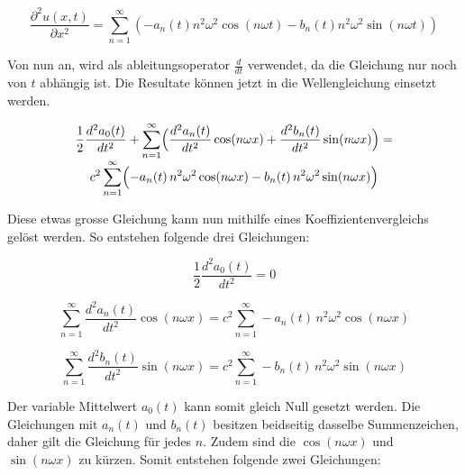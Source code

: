 \begin{equation}
	\frac{\partial^2 u(x,t)}{\partial x^2} = \sum_{n=1}^{\infty} \left( -a_n(t) n^2 \omega^2 \cos(n \omega t) - b_n(t) n^2 \omega^2 \sin(n \omega t) \right)
\end{equation}


Von nun an, wird als ableitungsoperator $\frac{d}{dt}$ verwendet, da die Gleichung nur noch von $t$ abhängig ist.
Die Resultate können jetzt in die Wellengleichung einsetzt werden. 



\begin{multline}
	\frac{1}{2}\frac{d^2 a_0(t)}{dt^2}
	+ \sum_{n=1}^{\infty}\Bigl(
	\frac{d^2 a_n(t)}{dt^2}\cos(n\omega x)
	+ \frac{d^2 b_n(t)}{dt^2}\sin(n\omega x)
	\Bigr)
	= \\[-0.8ex]
	c^2 \sum_{n=1}^{\infty}\Bigl(
	-a_n(t)\,n^2\omega^2\cos(n\omega x)
	-b_n(t)\,n^2\omega^2\sin(n\omega x)
	\Bigr)
\end{multline}


Diese etwas grosse Gleichung kann nun mithilfe eines Koeffizientenvergleichs gelöst werden.
So entstehen folgende drei Gleichungen:

\begin{equation}
	\frac{1}{2} \frac{d^2 a_0(t)}{d t^2} = 0
\end{equation}

\begin{equation}
	\sum_{n=1}^{\infty}
	\frac{d^2 a_n(t)}{dt^2}\cos(n\omega x)
	 = c^2 \sum_{n=1}^{\infty}
	-a_n(t)\,n^2\omega^2\cos(n\omega x)
	\end{equation}

\begin{equation}
	\sum_{n=1}^{\infty}
	\frac{d^2 b_n(t)}{dt^2}\sin(n\omega x) = c^2 \sum_{n=1}^{\infty}
	-b_n(t)\,n^2\omega^2\sin(n\omega x)
\end{equation}

Der variable Mittelwert $a_0(t)$ kann somit gleich Null gesetzt werden.
Die Gleichungen mit $a_n(t)$ und $b_n(t)$ besitzen beidseitig dasselbe Summenzeichen, daher gilt die Gleichung für jedes $n$. 
Zudem sind die $\cos(n\omega x)$ und $\sin(n\omega x)$ zu kürzen. 
Somit entstehen folgende zwei Gleichungen:

